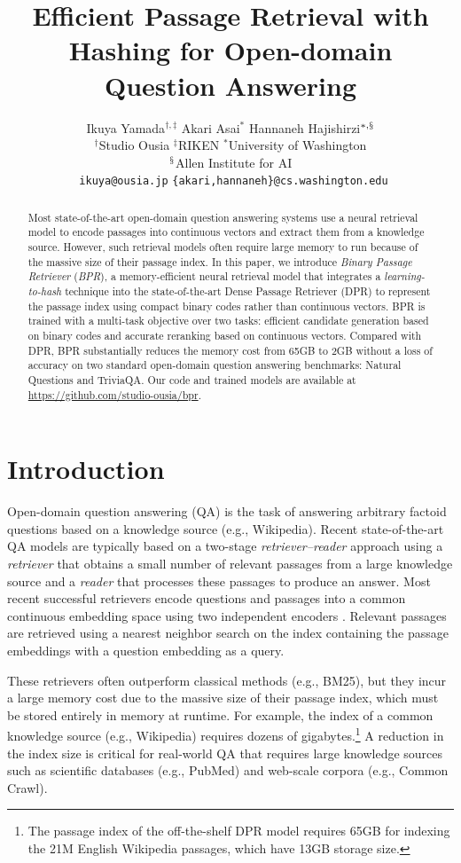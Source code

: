 \documentclass[11pt,a4paper]{article}
\title{Efficient Passage Retrieval with Hashing for Open-domain\\Question Answering}
\author{
    Ikuya Yamada$^{\dagger,\ddagger}$\qquad
    Akari Asai$^*$\qquad
    Hannaneh Hajishirzi$^{*,\mathsection}$\\
    $^\dagger$Studio Ousia \quad
    $^\ddagger$RIKEN \quad
    $^*$University of Washington\\
    $^\mathsection$Allen Institute for AI \\\
    \texttt{ikuya@ousia.jp} \quad 
    \texttt{\{akari,hannaneh\}@cs.washington.edu} \\ 
}
\date{}
\begin{document}
\maketitle
\begin{abstract}
  Most state-of-the-art open-domain question answering systems use a neural retrieval model to encode passages into continuous vectors and extract them from a knowledge source. However, such retrieval models often require large memory to run because of the massive size of their passage index.
  In this paper, we introduce \textit{Binary Passage Retriever} (\textit{BPR}), a memory-efficient neural retrieval model that integrates a \textit{learning-to-hash} technique into the state-of-the-art Dense Passage Retriever (DPR) \cite{Karpukhin2020DenseAnswering} to represent the passage index using compact binary codes rather than continuous vectors.
  BPR is trained with a  multi-task objective over two tasks: efficient candidate generation based on binary codes and accurate reranking based on continuous vectors.
  Compared with DPR, BPR substantially reduces the memory cost from 65GB to 2GB without a loss of accuracy on two standard open-domain question answering benchmarks: Natural Questions and TriviaQA.
  Our code and trained models are available at \url{https://github.com/studio-ousia/bpr}.
\end{abstract}

\section{Introduction}
Open-domain question answering (QA) is the task of answering arbitrary factoid questions based on a knowledge source (e.g., Wikipedia).
Recent state-of-the-art QA models are typically based on a two-stage \textit{retriever--reader} approach  \cite{Chen2017ReadingQuestions} using a \textit{retriever} that obtains a small number of relevant passages from a large knowledge source and a \textit{reader} that processes these passages to produce an answer.
Most recent successful retrievers encode questions and passages into a common continuous embedding space using two independent encoders \cite{Lee2019LatentAnswering,Karpukhin2020DenseAnswering,Guu2020}.
Relevant passages are retrieved using a nearest neighbor search on the index containing the passage embeddings with a question embedding as a query.

These retrievers often outperform classical methods (e.g., BM25), but they incur a large memory cost due to the massive size of their passage index, which must be stored entirely in memory at runtime.
For example, the index of a common knowledge source (e.g., Wikipedia) requires dozens of gigabytes.\footnote{The passage index of the off-the-shelf DPR model \cite{Karpukhin2020DenseAnswering} requires 65GB for indexing the 21M English Wikipedia passages, which have 13GB storage size.}
A reduction in the index size is critical for real-world QA that requires large knowledge sources such as scientific databases (e.g., PubMed) and web-scale corpora (e.g., Common Crawl).
\end{document}
